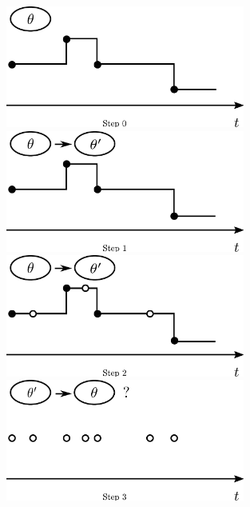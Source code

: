 \setlength{\unitlength}{0.8cm}
  \begin{figure}[H]
  \centering
  \begin{minipage}[!hp]{0.45\linewidth}
  \centering
    \includegraphics [width=0.70\textwidth, angle=0]{figs/plot0.pdf}
      \end{minipage}
  \begin{minipage}[hp]{0.45\linewidth}
  \centering
    \includegraphics [width=0.70\textwidth, angle=0]{figs/plot1.pdf}
    \vspace{-0 in}
  \end{minipage}
  \begin{minipage}[hp]{0.45\linewidth}
  \centering
    \includegraphics [width=0.70\textwidth, angle=0]{figs/plot2.pdf}
    \vspace{-0 in}
  \end{minipage}
  \begin{minipage}[hp]{0.45\linewidth}
  \centering
    \includegraphics [width=0.70\textwidth, angle=0]{figs/plot3.pdf}

\end{minipage}
\end{figure}
